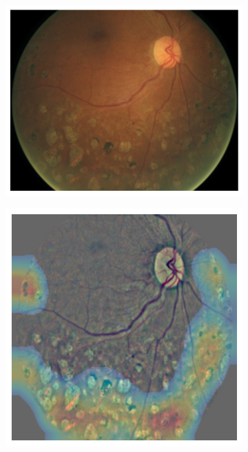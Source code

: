 \begin{figure}[tb]
     \begin{subfigure}[b]{0.32\textwidth}
         \centering
         \includegraphics[width=\textwidth, height=\textwidth]{figures/chapter7/attention/43670_left_hr.png}
    \end{subfigure}
    \hfill
    \begin{subfigure}[b]{0.32\textwidth}
         \centering
         \includegraphics[width=\textwidth, height=\textwidth]{figures/chapter7/attention/43670_left_heatmap.png}

\end{subfigure}
\end{figure}

